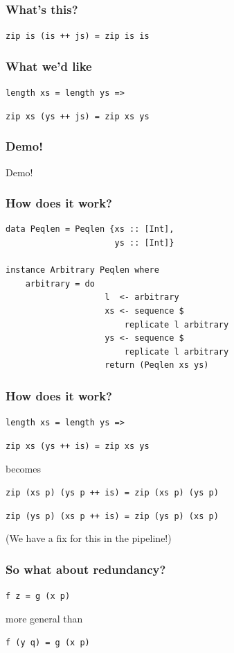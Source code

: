 \documentclass{beamer}
\begin{document}
\begin{frame}
    \frametitle{What's this?}
        \Large{\centerline{\texttt{zip is (is ++ js) = zip is is}}}
\end{frame}

\begin{frame}
    \frametitle{What we'd like}
    \Large{\centerline{\texttt{length xs = length ys =>}}
    \centerline{\texttt{zip xs (ys ++ js) = zip xs ys}}}
\end{frame}

\begin{frame}
    \frametitle{Demo!}
        \Huge{\centerline{Demo!}}
\end{frame}

\begin{frame}[fragile]
    \frametitle{How does it work?}
    \begin{verbatim}
data Peqlen = Peqlen {xs :: [Int],
                      ys :: [Int]}

instance Arbitrary Peqlen where
    arbitrary = do
                    l  <- arbitrary 
                    xs <- sequence $
                        replicate l arbitrary
                    ys <- sequence $
                        replicate l arbitrary
                    return (Peqlen xs ys)
        \end{verbatim}

\end{frame}

\begin{frame}
    \frametitle{How does it work?}
    \Large{\centerline{\texttt{length xs = length ys =>}}}
    \Large{\centerline{\texttt{zip xs (ys ++ is) = zip xs ys}}}
        \centerline{}
        \centerline{becomes}
        \centerline{}
        \Large{\centerline{\texttt{zip (xs p) (ys p ++ is) = zip (xs p) (ys p)}}}
        \pause
        \centerline{}
        \centerline{\texttt{zip (ys p) (xs p ++ is) = zip (ys p) (xs p)}}
        \centerline{}
        \centerline{(We have a fix for this in the pipeline!)}
\end{frame}

\begin{frame}
    \frametitle{So what about redundancy?}
        \Large{\centerline{\texttt{f z = g (x p)}}}
        \centerline{}
        \centerline{more general than}
        \centerline{}
        \Large{\centerline{\texttt{f (y q) = g (x p)}}}
\end{frame}
\end{document}

